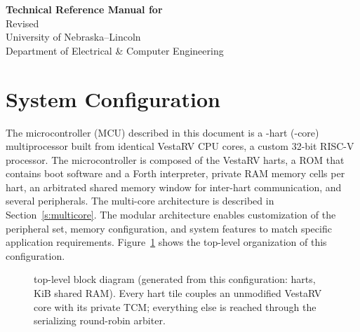 \documentclass[11pt,pdftex,portrait,letterpaper]{article}
\begin{document}
	
\vspace*{30ex}
\begin{center}
	\textbf{Technical Reference Manual for \AsicNameForUserGuide} \\
	\vspace{2ex}
	Revised \RevisionDateFull \\
	\vspace{8ex}
	University of Nebraska--Lincoln \\
	Department of Electrical \& Computer Engineering \\
	\vspace{4ex}
\end{center}

\newpage

\tableofcontents
\newpage



\section{System Configuration} \label{s:config}
The microcontroller (MCU) described in this document is a \NumHartsWord-hart (\NumHartsWord-core) multiprocessor built from \NumHartsWord{} identical VestaRV CPU cores, a custom 32-bit RISC-V processor. The microcontroller is composed of the \NumHartsWord{} VestaRV harts, a ROM that contains boot software and a Forth interpreter, private RAM memory cells per hart, an arbitrated shared memory window for inter-hart communication, and several peripherals. The multi-core architecture is described in Section~\ref{s:multicore}. The modular architecture enables customization of the peripheral set, memory configuration, and system features to match specific application requirements. Figure~\ref{fig:system-block-diagram} shows the top-level organization of this configuration.

\begin{figure}[h]
	\centering
	\resizebox{\linewidth}{!}{}
	\caption{\AsicNameForUserGuide{} top-level block diagram (generated from this configuration: \NumHarts{} harts, \SharedRamSizeKiB\,KiB shared RAM). Every hart tile couples an unmodified VestaRV core with its private TCM; everything else is reached through the serializing round-robin arbiter.}
	\label{fig:system-block-diagram}
\end{figure}

\end{document}
